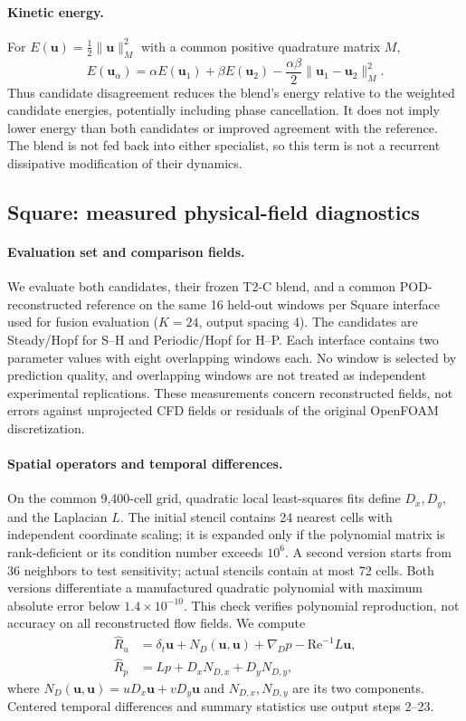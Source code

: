 \paragraph{Kinetic energy.}
For $E(\bm u)=\tfrac12\|\bm u\|_M^2$ with a common positive
quadrature matrix $M$,
\begin{equation}
E(\bm u_\alpha)=\alpha E(\bm u_1)+\beta E(\bm u_2)
-\frac{\alpha\beta}{2}\|\bm u_1-\bm u_2\|_M^2.
\end{equation}
Thus candidate disagreement reduces the blend's energy relative to the
weighted candidate energies, potentially including phase cancellation.
It does not imply lower energy than both candidates or improved agreement
with the reference. The blend is not fed back into either specialist,
so this term is not a recurrent dissipative modification of their dynamics.

\subsection{Square: measured physical-field diagnostics}
\label{app:fusion_measured}

\paragraph{Evaluation set and comparison fields.}
We evaluate both candidates, their frozen T2-C blend, and a common
POD-reconstructed reference on the same 16 held-out windows per Square
interface used for fusion evaluation ($K=24$, output spacing 4).
The candidates are Steady/Hopf for S--H and Periodic/Hopf for H--P.
Each interface contains two parameter values with eight overlapping
windows each. No window is selected by prediction quality, and overlapping
windows are not treated as independent experimental replications.
These measurements concern reconstructed fields, not errors against
unprojected CFD fields or residuals of the original OpenFOAM discretization.

\paragraph{Spatial operators and temporal differences.}
On the common 9,400-cell grid, quadratic local least-squares fits define
$D_x,D_y$, and the Laplacian $L$. The initial stencil contains 24 nearest
cells with independent coordinate scaling; it is expanded only if the
polynomial matrix is rank-deficient or its condition number exceeds
$10^6$. A second version starts from 36 neighbors to test sensitivity;
actual stencils contain at most 72 cells. Both versions differentiate
a manufactured quadratic polynomial with maximum absolute error below
$1.4\times10^{-10}$. This check verifies polynomial reproduction, not
accuracy on all reconstructed flow fields. We compute
\begin{align}
\widehat R_u&=\delta_t\bm u+N_D(\bm u,\bm u)
+\nabla_Dp-\mathrm{Re}^{-1}L\bm u,\\
\widehat R_p&=Lp+D_xN_{D,x}+D_yN_{D,y},
\end{align}
where $N_D(\bm u,\bm u)=uD_x\bm u+vD_y\bm u$ and
$N_{D,x},N_{D,y}$ are its two components. Centered temporal differences
and summary statistics use output steps 2--23.


